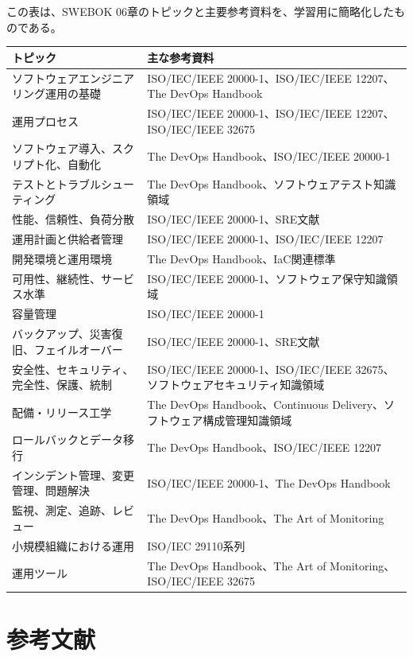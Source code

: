 \documentclass[uplatex,dvipdfmx,a4paper,10pt]{jsarticle}
\begin{document}
この表は、SWEBOK 06章のトピックと主要参考資料を、学習用に簡略化したものである。

\begin{longtable}{L{70mm}L{80mm}}
\toprule
トピック & 主な参考資料 \\
\midrule
ソフトウェアエンジニアリング運用の基礎 & ISO/IEC/IEEE 20000-1、ISO/IEC/IEEE 12207、The DevOps Handbook \\
運用プロセス & ISO/IEC/IEEE 20000-1、ISO/IEC/IEEE 12207、ISO/IEC/IEEE 32675 \\
ソフトウェア導入、スクリプト化、自動化 & The DevOps Handbook、ISO/IEC/IEEE 20000-1 \\
テストとトラブルシューティング & The DevOps Handbook、ソフトウェアテスト知識領域 \\
性能、信頼性、負荷分散 & ISO/IEC/IEEE 20000-1、SRE文献 \\
運用計画と供給者管理 & ISO/IEC/IEEE 20000-1、ISO/IEC/IEEE 12207 \\
開発環境と運用環境 & The DevOps Handbook、IaC関連標準 \\
可用性、継続性、サービス水準 & ISO/IEC/IEEE 20000-1、ソフトウェア保守知識領域 \\
容量管理 & ISO/IEC/IEEE 20000-1 \\
バックアップ、災害復旧、フェイルオーバー & ISO/IEC/IEEE 20000-1、SRE文献 \\
安全性、セキュリティ、完全性、保護、統制 & ISO/IEC/IEEE 20000-1、ISO/IEC/IEEE 32675、ソフトウェアセキュリティ知識領域 \\
配備・リリース工学 & The DevOps Handbook、Continuous Delivery、ソフトウェア構成管理知識領域 \\
ロールバックとデータ移行 & The DevOps Handbook、ISO/IEC/IEEE 12207 \\
インシデント管理、変更管理、問題解決 & ISO/IEC/IEEE 20000-1、The DevOps Handbook \\
監視、測定、追跡、レビュー & The DevOps Handbook、The Art of Monitoring \\
小規模組織における運用 & ISO/IEC 29110系列 \\
運用ツール & The DevOps Handbook、The Art of Monitoring、ISO/IEC/IEEE 32675 \\
\bottomrule
\end{longtable}

\section{参考文献}
\end{document}
